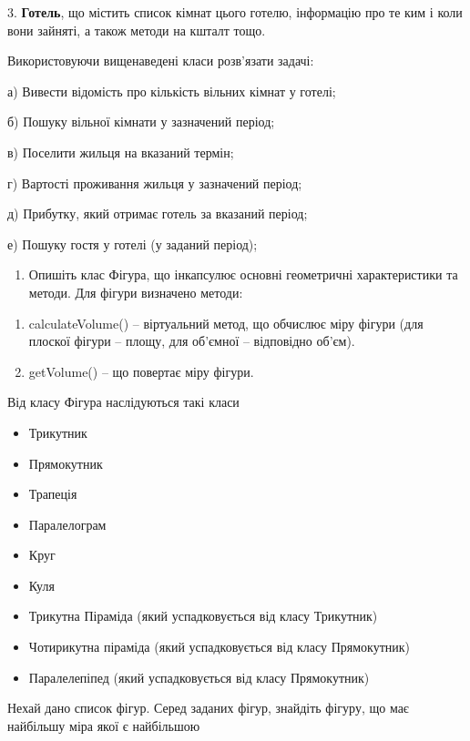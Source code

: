 \documentclass[]{article}
\begin{document}
3. \textbf{Готель}, що містить список кімнат цього готелю, інформацію
про те ким і коли вони зайняті, а також методи на кшталт тощо.

Використовуючи вищенаведені класи розв'язати задачі:

а) Вивести відомість про кількість вільних кімнат у готелі;

б) Пошуку вільної кімнати у зазначений період;

в) Поселити жильця на вказаний термін;

г) Вартості проживання жильця у зазначений період;

д) Прибутку, який отримає готель за вказаний період;

е) Пошуку гостя у готелі (у заданий період);

\begin{enumerate}
\def\labelenumi{\arabic{enumi})}
\item
  Опишіть клас Фігура, що інкапсулює основні геометричні характеристики
  та методи. Для фігури визначено методи:
\end{enumerate}

\begin{enumerate}
\def\labelenumi{\arabic{enumi}.}
\item
  calculateVolume() -- віртуальний метод, що обчислює міру фігури (для
  плоскої фігури -- площу, для об'ємної -- відповідно об'єм).
\item
  getVolume() -- що повертає міру фігури.
\end{enumerate}

Від класу Фігура наслідуються такі класи

\begin{itemize}
\item
  Трикутник
\item
  Прямокутник
\item
  Трапеція
\item
  Паралелограм
\item
  Круг
\item
  Куля
\item
  Трикутна Піраміда (який успадковується від класу Трикутник)
\item
  Чотирикутна піраміда (який успадковується від класу Прямокутник)
\item
  Паралелепіпед (який успадковується від класу Прямокутник)
\end{itemize}

Нехай дано список фігур. Серед заданих фігур, знайдіть фігуру, що має
найбільшу міра якої є найбільшою
\end{document}
